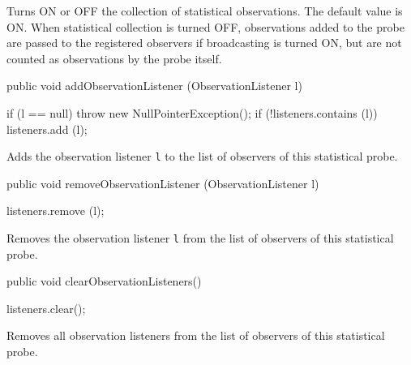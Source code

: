 \begin{tabb}  Turns ON or OFF the collection of statistical
  observations.  The default value is ON.
  When statistical collection is turned OFF, 
  observations added to the probe are passed to the
  registered observers if broadcasting is turned ON, but are not
  counted as observations by the probe itself.
\end{tabb}
\begin{htmlonly}
\end{htmlonly}
\begin{code}

   public void addObservationListener (ObservationListener l)\begin{hide} {
      if (l == null)
         throw new NullPointerException();
      if (!listeners.contains (l))
         listeners.add (l);
   }\end{hide}
\end{code}
\begin{tabb}   Adds the observation listener \texttt{l} to the list of observers of
    this statistical probe.
\end{tabb}
\begin{htmlonly}
\end{htmlonly}
\begin{code}

   public void removeObservationListener (ObservationListener l)\begin{hide} {
      listeners.remove (l);
   }\end{hide}
\end{code}
\begin{tabb}   Removes the observation listener \texttt{l} from the list of observers of
    this statistical probe.
\end{tabb}
\begin{htmlonly}
\end{htmlonly}
\begin{code}

   public void clearObservationListeners()\begin{hide} {
      listeners.clear();
   }\end{hide}
\end{code}
\begin{tabb}   Removes all observation listeners from the list of observers of
    this statistical probe.
\end{tabb}

